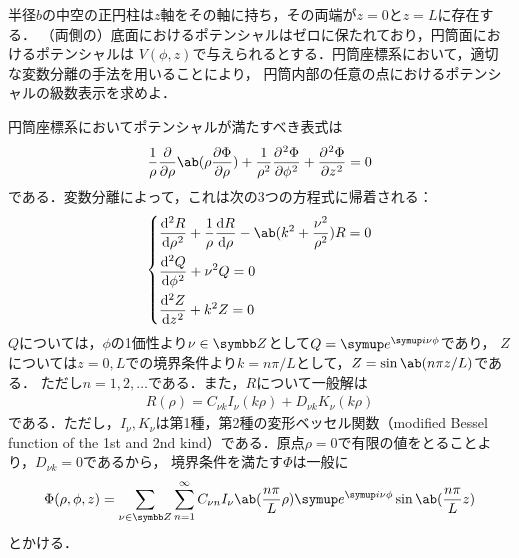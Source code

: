 \begin{bx1}
半径$b$の中空の正円柱は$z$軸をその軸に持ち，その両端が$z =0$と$z = L$に存在する．
（両側の）底面におけるポテンシャルはゼロに保たれており，円筒面におけるポテンシャルは
$V(\phi,z)$で与えられるとする．円筒座標系において，適切な変数分離の手法を用いることにより，
円筒内部の任意の点におけるポテンシャルの級数表示を求めよ．
\end{bx1}
円筒座標系においてポテンシャルが満たすべき表式は
\begin{gather}%
  \frac{1}{\rho} \diffp**{\rho}{\ab(\rho\diffp{\Phi}{\rho})} + \frac{1}{\rho^2} \diffp[2]{\Phi}{\phi} + \diffp[2]{\Phi}{z} = 0
\end{gather}%
である．変数分離によって，これは次の3つの方程式に帰着される：
\begin{gather}%
  \begin{dcases}%
    \diff[2]{R}{\rho} + \frac{1}{\rho} \diff{R}{\rho} - \ab(k^2 + \frac{\nu^2}{\rho^2})R = 0\\
    \diff[2]{Q}{\phi} + \nu^2 Q = 0\\
    \diff[2]{Z}{z} + k^2 Z = 0
  \end{dcases}%
\end{gather}%
$Q$については，$\phi$の1価性より$\nu\in \Z$として$Q = \e^{\i \nu \phi}$であり，
$Z$については$z = 0, L$での境界条件より$k = n\pi/L$として，$Z = \sin\ab(n \pi z/L)$である．
ただし$n = 1, 2, \ldots$である．また，$R$について一般解は
\begin{gather}%
  R(\rho) = C_{\nu k} I_\nu(k\rho) + D_{\nu k} K_\nu(k\rho)
\end{gather}%
である．ただし，$I_\nu, K_\nu$は第1種，第2種の変形ベッセル関数（modified Bessel function of the 1st and 2nd kind）である．原点$\rho = 0$で有限の値をとることより，$D_{\nu k} = 0$であるから，
境界条件を満たす$\Phi$は一般に
\begin{gather}%
  \Phi(\rho, \phi ,z) = \sum_{\nu \in \Z} \sum_{n = 1}^\infty C_{\nu n} I_\nu \ab(\frac{n \pi}{L}\rho) \e^{\i \nu \phi} \sin\ab(\frac{n \pi}{L} z)
\end{gather}%
とかける．
\clearpage
